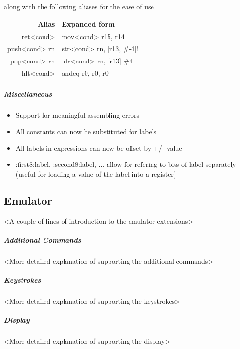 \documentclass[11pt]{article}
\begin{document}
along with the following aliases for the ease of use
\begin{center}
	\begin{tabular}{r|l}
		\textbf{Alias} & \textbf{Expanded form} \\
		ret<cond> & mov<cond> r15, r14\\
		push<cond> rn & str<cond> rn, [r13, \#-4]!\\
		pop<cond> rn & ldr<cond> rn, [r13] \#4\\
		hlt<cond> & andeq r0, r0, r0
	\end{tabular}
\end{center}
\subparagraph*{Miscellaneous}
\begin{itemize}
\item Support for meaningful assembling errors
\item All constants can now be substituted for labels
\item All labels in expressions can now be offset by +/- value
\item :first8:label, :second8:label, ... allow for refering to bits of label separately (useful for loading a value of the label into a register)
\end{itemize}
\subsection*{Emulator}
<A couple of lines of introduction to the emulator extensions>
\subparagraph*{Additional Commands}
<More detailed explanation of supporting the additional commands>
\subparagraph*{Keystrokes}
<More detailed explanation of supporting the keystrokes>
\subparagraph*{Display}
<More detailed explanation of supporting the display>
\end{document}

